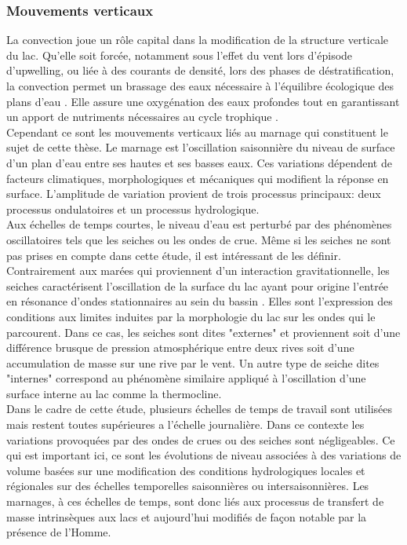 \subsubsection{{\selectfont Mouvements verticaux}}

La convection joue un rôle capital dans la modification de la structure verticale du lac. Qu'elle soit forcée, notamment sous l'effet du vent lors d'épisode d'upwelling, ou liée à des courants de densité, lors des phases de déstratification, la convection permet un brassage des eaux nécessaire à l'équilibre écologique des plans d'eau \citep{bouffard2019}. Elle assure une oxygénation des eaux profondes tout en garantissant un apport de nutriments nécessaires au cycle trophique \citep{schladow2002,pernica2017}.\\
Cependant ce sont les mouvements verticaux liés au marnage qui constituent le sujet de cette thèse. Le marnage est l'oscillation saisonnière du niveau de surface d'un plan d'eau entre ses hautes et ses basses eaux. Ces variations dépendent de facteurs climatiques, morphologiques et mécaniques qui modifient la réponse en surface. 
L'amplitude de variation provient de trois processus principaux: deux processus ondulatoires et un processus hydrologique.\\
Aux échelles de temps courtes, le niveau d'eau est perturbé par des phénomènes oscillatoires tels que les seiches ou les ondes de crue. Même si les seiches ne sont pas prises en compte dans cette étude, il est intéressant de les définir. Contrairement aux marées qui proviennent d'un interaction gravitationnelle, les seiches caractérisent l'oscillation de la surface du lac ayant pour origine l'entrée en résonance d'ondes stationnaires au sein du bassin \citep{rueda2002}. Elles sont l'expression des conditions aux limites induites par la morphologie du lac sur les ondes qui le parcourent. Dans ce cas, les seiches sont dites "externes" et proviennent soit d'une différence brusque de pression atmosphérique entre deux rives soit d'une accumulation de masse sur une rive par le vent. Un autre type de seiche dites "internes" correspond au phénomène similaire appliqué à l'oscillation d'une surface interne au lac comme la thermocline.\\

Dans le cadre de cette étude, plusieurs échelles de temps de travail sont utilisées mais restent toutes supérieures a l'échelle journalière. Dans ce contexte les variations provoquées par des ondes de crues ou des seiches sont négligeables. Ce qui est important ici, ce sont les évolutions de niveau associées à des variations de volume basées sur une modification des conditions hydrologiques locales et régionales sur des échelles temporelles saisonnières ou intersaisonnières. Les marnages, à ces échelles de temps, sont donc liés aux processus de transfert de masse intrinsèques aux lacs et aujourd'hui modifiés de façon notable par la présence de l'Homme. 

